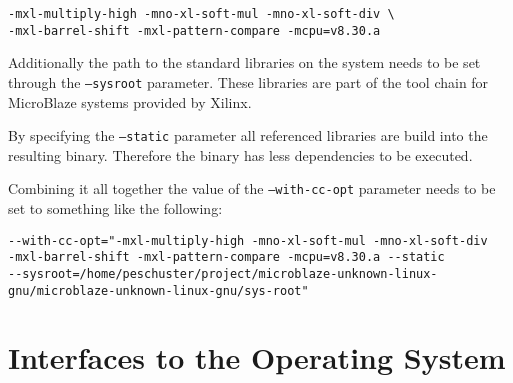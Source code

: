 \begin{verbatim}
-mxl-multiply-high -mno-xl-soft-mul -mno-xl-soft-div \
-mxl-barrel-shift -mxl-pattern-compare -mcpu=v8.30.a
\end{verbatim}

Additionally the path to the standard libraries on the system needs to be set through the \texttt{--sysroot} parameter. These libraries are part of the tool chain for MicroBlaze systems provided by Xilinx. 

By specifying the \texttt{--static} parameter all referenced libraries are build into the resulting binary. Therefore the binary has less dependencies to be executed.

Combining it all together the value of the \texttt{--with-cc-opt} parameter needs to be set to something like the following: 

\begin{verbatim}
--with-cc-opt="-mxl-multiply-high -mno-xl-soft-mul -mno-xl-soft-div 
-mxl-barrel-shift -mxl-pattern-compare -mcpu=v8.30.a --static 
--sysroot=/home/peschuster/project/microblaze-unknown-linux-gnu/microblaze-unknown-linux-gnu/sys-root"
\end{verbatim}

\section{Interfaces to the Operating System}
